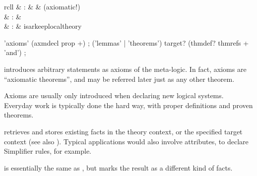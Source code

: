 \begin{isabellebody}
\begin{isamarkuptext}
\begin{descr}
  \end{descr}%
\end{isamarkuptext}%
\isamarkuptrue%
%
\isamarkuptrue%
%
\begin{isamarkuptext}%
\begin{matharray}{rcll}
    \hypertarget{command.axioms}{\hyperlink{command.axioms}{\mbox{}}} & : &  & (axiomatic!) \\
    \hypertarget{command.lemmas}{\hyperlink{command.lemmas}{\mbox{}}} & : &  \\
    \hypertarget{command.theorems}{\hyperlink{command.theorems}{\mbox{}}} & : & isarkeep{local{\dsh}theory} \\
  \end{matharray}

  \begin{rail}
    'axioms' (axmdecl prop +)
    ;
    ('lemmas' | 'theorems') target? (thmdef? thmrefs + 'and')
    ;
  \end{rail}

  \begin{descr}
  
  \item [\hyperlink{command.axioms}{\mbox{\isa{\isacommand{axioms}}}}~\isa{{\isachardoublequote}a{\isacharcolon}\ {\isasymphi}{\isachardoublequote}}] introduces arbitrary
  statements as axioms of the meta-logic.  In fact, axioms are
  ``axiomatic theorems'', and may be referred later just as any other
  theorem.
  
  Axioms are usually only introduced when declaring new logical
  systems.  Everyday work is typically done the hard way, with proper
  definitions and proven theorems.
  
  \item [\hyperlink{command.lemmas}{\mbox{\isa{\isacommand{lemmas}}}}~\isa{{\isachardoublequote}a\ {\isacharequal}\ b\isactrlsub {\isadigit{1}}\ {\isasymdots}\ b\isactrlsub n{\isachardoublequote}}]
  retrieves and stores existing facts in the theory context, or the
  specified target context (see also ).  Typical
  applications would also involve attributes, to declare Simplifier
  rules, for example.
  
  \item [\hyperlink{command.theorems}{\mbox{\isa{\isacommand{theorems}}}}] is essentially the same as \hyperlink{command.lemmas}{\mbox{}}, but marks the result as a different kind of facts.


\end{descr}
\end{isamarkuptext}
\end{isabellebody}
